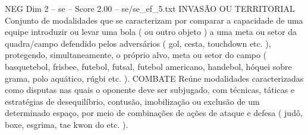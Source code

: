 \begin{textsample}{NEG Dim 2 – se – Score 2.00 – se/se\_ef\_5.txt}
INVASÃO OU TERRITORIAL Conjunto de modalidades que se caracterizam por comparar a capacidade de uma equipe introduzir ou levar uma bola ( ou outro objeto ) a uma meta ou setor da quadra/campo defendido pelos adversários ( gol, cesta, touchdown etc. ), protegendo, simultaneamente, o próprio alvo, meta ou setor do campo ( basquetebol, frisbee, futebol, futsal, futebol americano, handebol, hóquei sobre grama, polo aquático, rúgbi etc. ).
COMBATE Reúne modalidades caracterizadas como disputas nas quais o oponente deve ser subjugado, com técnicas, táticas e estratégias de desequilíbrio, contusão, imobilização ou exclusão de um determinado espaço, por meio de combinações de ações de ataque e defesa ( judô, boxe, esgrima, tae kwon do etc. ).

\end{textsample}
